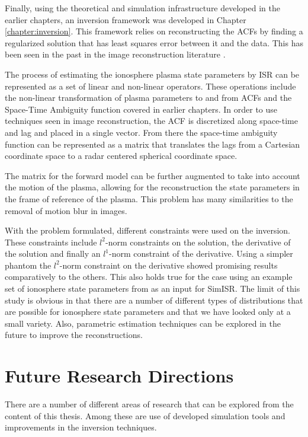 Finally, using the theoretical and simulation infrastructure developed in the earlier chapters, an inversion framework was developed in Chapter \ref{chapter:inversion}. This framework relies on reconstructing the ACFs by finding a regularized solution that has least squares error between it and the data. This has been seen in the past in the image reconstruction literature \citep{Karl:2005jy}.

The process of estimating the ionosphere plasma state parameters by ISR can be represented as a set of linear and non-linear operators. These operations include the non-linear transformation of plasma parameters to and from ACFs and the Space-Time Ambiguity function covered in earlier chapters. In order to use techniques seen in image reconstruction, the ACF is discretized along space-time and lag and placed in a single vector. From there the space-time ambiguity function can be represented as a matrix that translates the lags from a Cartesian coordinate space to a radar centered spherical coordinate space. 

The matrix for the forward model can be further augmented to take into account the motion of the plasma, allowing for the reconstruction the state parameters in the frame of reference of the plasma. This problem has many similarities to the removal of motion blur in images.

With the problem formulated, different constraints were used on the inversion. These constraints include $l^2$-norm constraints on the solution, the derivative of the solution and finally an $l^1$-norm constraint of the derivative. Using a simpler phantom the $l^2$-norm constraint on the derivative showed promising results comparatively to the others. This also holds true for the case using an example set of ionosphere state parameters from \citet{Perry:2015jf} as an input for SimISR. The limit of this study is obvious in that there are a number of different types of distributions that are possible for ionosphere state parameters and that we have looked only at a small variety. Also, parametric estimation techniques can be explored in the future to improve the reconstructions. 

\section{Future Research Directions}

There are a number of different areas of research that can be explored from the content of this thesis. Among these are use of developed simulation tools and improvements in the inversion techniques.


